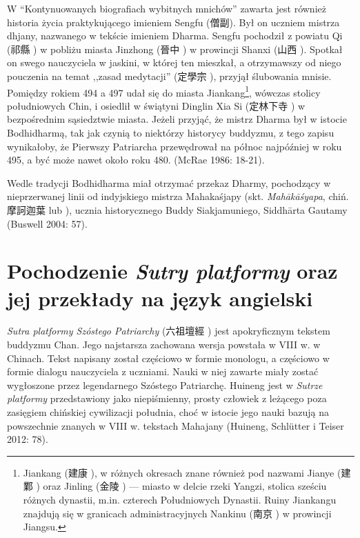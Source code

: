 W ``Kontynuowanych biografiach wybitnych mnichów'' zawarta jest również historia życia praktykującego imieniem Sengfu (僧副).
Był on uczniem mistrza dhjany, nazwanego w tekście imieniem Dharma. Sengfu pochodził z powiatu Qi (祁縣 ) w pobliżu miasta Jinzhong (晉中 ) w prowincji Shanxi (山西 ).
Spotkał on swego nauczyciela w jaskini, w której ten mieszkał, a otrzymawszy od niego pouczenia na temat ,,zasad medytacji'' (定學宗 ), przyjął ślubowania mnisie. Pomiędzy rokiem 494 a 497 udał się do miasta Jiankang\footnote{Jiankang (建康 ), w różnych okresach znane również pod nazwami Jianye (建鄴 ) oraz Jinling (金陵 ) --- miasto w delcie rzeki Yangzi, stolica sześciu różnych dynastii, m.in. czterech Południowych Dynastii. Ruiny Jiankangu znajdują się w granicach administracyjnych Nankinu (南京 ) w prowincji Jiangsu.}, wówczas stolicy południowych Chin, i osiedlił w świątyni Dinglin Xia Si (定林下寺 ) w bezpośrednim sąsiedztwie miasta.
Jeżeli przyjąć, że mistrz Dharma był w istocie Bodhidharmą, tak jak czynią to niektórzy historycy buddyzmu, z tego zapisu wynikałoby, że Pierwszy Patriarcha przewędrował na północ najpóźniej w roku 495, a być może nawet około roku 480.
(McRae 1986: 18-21).

Wedle tradycji Bodhidharma miał otrzymać przekaz Dharmy, pochodzący w nieprzerwanej linii od indyjskiego mistrza Mahakaśjapy (skt. \textit{Mahākāśyapa}, chiń. 摩訶迦葉  lub ), ucznia historycznego Buddy Siakjamuniego, Siddhārta Gautamy
(Buswell 2004: 57).

\section{Pochodzenie \textit{Sutry platformy} oraz jej przekłady na język angielski}
\textit{Sutra platformy Szóstego Patriarchy} (六祖壇經 ) jest apokryficznym tekstem buddyzmu Chan.
Jego najstarsza zachowana wersja powstała w VIII w. w Chinach. Tekst napisany został częściowo w formie monologu, a częściowo w formie dialogu nauczyciela z uczniami.
Nauki w niej zawarte miały zostać wygłoszone przez legendarnego Szóstego Patriarchę.
Huineng jest w \textit{Sutrze platformy} przedstawiony jako niepiśmienny, prosty człowiek z leżącego poza zasięgiem chińskiej cywilizacji południa, choć w istocie jego nauki bazują na powszechnie znanych w VIII w. tekstach Mahajany
(Huineng, Schlütter i Teiser 2012: 78).

